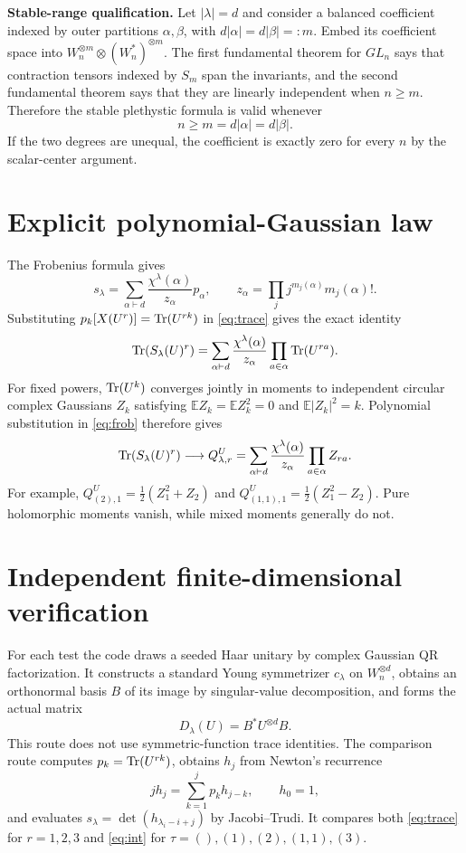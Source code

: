 \documentclass[11pt]{article}
\begin{document}
\textbf{Stable-range qualification.}  Let $|\lambda|=d$ and consider a
balanced coefficient indexed by outer partitions $\alpha,\beta$, with
$d|\alpha|=d|\beta|=:m$.  Embed its coefficient space into
$W_n^{\otimes m}\otimes(W_n^*)^{\otimes m}$.  The first fundamental theorem
for $GL_n$ says that contraction tensors indexed by $S_m$ span the invariants,
and the second fundamental theorem says that they are linearly independent
when $n\geq m$.  Therefore the stable plethystic formula is valid whenever
\[
n\geq m=d|\alpha|=d|\beta|.
\]
If the two degrees are unequal, the coefficient is exactly zero for every $n$
by the scalar-center argument.

\section{Explicit polynomial-Gaussian law}
The Frobenius formula gives
\begin{equation}
 s_\lambda=\sum_{\alpha\vdash d}\frac{\chi^\lambda(\alpha)}{z_\alpha}p_\alpha,
 \qquad z_\alpha=\prod_j j^{m_j(\alpha)}m_j(\alpha)!.
\end{equation}
Substituting $p_k[X(U^r)]=\operatorname{Tr}(U^{rk})$ in \eqref{eq:trace} gives the exact identity
\begin{equation}\label{eq:frob}
 \operatorname{Tr}(S_\lambda(U)^r)=\sum_{\alpha\vdash d}\frac{\chi^\lambda(\alpha)}{z_\alpha}
 \prod_{a\in\alpha}\operatorname{Tr}(U^{ra}).
\end{equation}
For fixed powers, $\operatorname{Tr}(U^k)$ converges jointly in moments to independent circular complex Gaussians $Z_k$ satisfying $\mathbb E Z_k=\mathbb E Z_k^2=0$ and $\mathbb E|Z_k|^2=k$. Polynomial substitution in \eqref{eq:frob} therefore gives
\begin{equation}
 \operatorname{Tr}(S_\lambda(U)^r)\longrightarrow
 Q^U_{\lambda,r}=\sum_{\alpha\vdash d}\frac{\chi^\lambda(\alpha)}{z_\alpha}\prod_{a\in\alpha}Z_{ra}.
\end{equation}
For example, $Q^U_{(2),1}=\tfrac12(Z_1^2+Z_2)$ and $Q^U_{(1,1),1}=\tfrac12(Z_1^2-Z_2)$. Pure holomorphic moments vanish, while mixed moments generally do not.

\section{Independent finite-dimensional verification}
For each test the code draws a seeded Haar unitary by complex Gaussian QR factorization. It constructs a standard Young symmetrizer $c_\lambda$ on $W_n^{\otimes d}$, obtains an orthonormal basis $B$ of its image by singular-value decomposition, and forms the actual matrix
\begin{equation}
 D_\lambda(U)=B^*U^{\otimes d}B.
\end{equation}
This route does not use symmetric-function trace identities. The comparison route computes $p_k=\operatorname{Tr}(U^{rk})$, obtains $h_j$ from Newton's recurrence
\begin{equation}
 jh_j=\sum_{k=1}^j p_kh_{j-k},\qquad h_0=1,
\end{equation}
and evaluates $s_\lambda=\det(h_{\lambda_i-i+j})$ by Jacobi--Trudi. It compares both \eqref{eq:trace} for $r=1,2,3$ and \eqref{eq:int} for $\tau=(),(1),(2),(1,1),(3)$.
\end{document}

